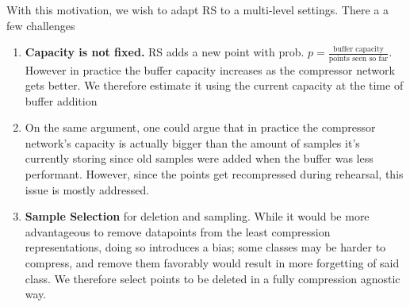\documentclass[colorinlistoftodos]{article} %
\begin{document}
With this motivation, we wish to adapt RS to a multi-level settings. There a a few challenges 
\begin{enumerate}
    \item \textbf{Capacity is not fixed.} RS adds a new point with prob. $p=\frac{\text{buffer capacity}}{\text{points seen so far}}$. However in practice the buffer capacity increases as the compressor network gets better. We therefore estimate it using the current capacity at the time of buffer addition
    \item On the same argument, one could argue that in practice the compressor network's capacity is actually bigger than the amount of samples it's currently storing since old samples were added when the buffer was less performant. However, since the points get recompressed during rehearsal, this issue is mostly addressed.
    \item \textbf{Sample Selection} for deletion and sampling. While it would be more advantageous to remove datapoints from the least compression representations, doing so introduces a bias; some classes may be harder to compress, and remove them favorably would result in more forgetting of said class. We therefore select points to be deleted in a fully compression agnostic way.
    
\end{enumerate}


\end{document}
